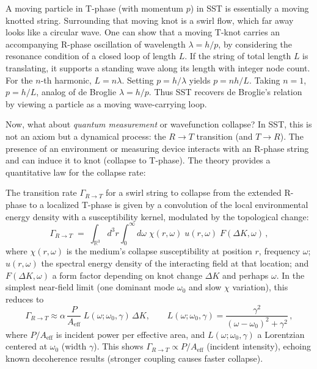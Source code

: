 \documentclass[10pt,reprint,aps,onecolumn,nofootinbib]{revtex4-2}
\begin{document}
	A moving particle in T-phase (with momentum $p$) in SST is essentially a moving knotted string. Surrounding that moving knot is a swirl flow, which far away looks like a circular wave. One can show that a moving T-knot carries an accompanying R-phase oscillation of wavelength $\lambda = h/p$, by considering the resonance condition of a closed loop of length $L$. If the string of total length $L$ is translating, it supports a standing wave along its length with integer node count. For the $n$-th harmonic, $L = n \lambda$. Setting $p = h/\lambda$ yields $p = n h/L$. Taking $n=1$, $p = h/L$, analog of de Broglie $\lambda = h/p$. Thus SST recovers de Broglie’s relation by viewing a particle as a moving wave-carrying loop.

	Now, what about \emph{quantum measurement} or wavefunction collapse? In SST, this is not an axiom but a dynamical process: the $R\to T$ transition (and $T\to R$). The presence of an environment or measuring device interacts with an R-phase string and can induce it to knot (collapse to T-phase). The theory provides a quantitative law for the collapse rate:

	\begin{tcolorbox}[title=Theorem 8.1: R$\to$T Transition Dynamics (Collapse Rate)]
		The transition rate $\Gamma_{R\to T}$ for a swirl string to collapse from the extended R-phase to a localized T-phase is given by a convolution of the local environmental energy density with a susceptibility kernel, modulated by the topological change:
		\[
			\Gamma_{R\to T} \;=\; \int_{\mathbb{R}^3}\! d^3r \int_0^{\infty}\! d\omega\;\chi(r,\omega)\;u(r,\omega)\;F(\Delta K,\omega)\,,
		\]
		where $\chi(r,\omega)$ is the medium’s collapse susceptibility at position $r$, frequency $\omega$; $u(r,\omega)$ the spectral energy density of the interacting field at that location; and $F(\Delta K,\omega)$ a form factor depending on knot change $\Delta K$ and perhaps $\omega$. In the simplest near-field limit (one dominant mode $\omega_0$ and slow $\chi$ variation), this reduces to
		\[
			\Gamma_{R\to T} \approx \alpha\, \frac{P}{A_{\text{eff}}}\; L(\omega; \omega_0,\gamma)\,\Delta K, \qquad
			L(\omega; \omega_0,\gamma) = \frac{\gamma^2}{(\omega-\omega_0)^2+\gamma^2}\,,
		\]
		where $P/A_{\text{eff}}$ is incident power per effective area, and $L(\omega; \omega_0,\gamma)$ a Lorentzian centered at $\omega_0$ (width $\gamma$). This shows $\Gamma_{R\to T} \propto P/A_{\text{eff}}$ (incident intensity), echoing known decoherence results (stronger coupling causes faster collapse).
	\end{tcolorbox}
\end{document}
